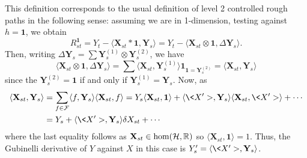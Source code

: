 \documentclass[11pt]{style/preprint}
\begin{document}
This definition corresponds to the usual definition of level 2 controlled rough paths in the following sense: 
assuming we are in 1-dimension, testing against \(h = \mathbf{1}\), we obtain
\[R^{\mathbf{1}}_{st} = Y_t - \langle \mathbf{X}_{st} * \mathbf{1}, \mathbf{Y}_s\rangle
  = Y_t - \langle \mathbf{X}_{st} \otimes \mathbf{1}, \Delta \mathbf{Y}_s\rangle.\]
Then, writing \(\Delta \mathbf{Y}_s = \sum \mathbf{Y}^{(1)}_s \otimes \mathbf{Y}^{(2)}_s\), we have 
\[\langle \mathbf{X}_{st} \otimes \mathbf{1}, \Delta \mathbf{Y}_s\rangle
  = \sum \langle \mathbf{X}_{st}, \mathbf{Y}^{(1)}_s\rangle \mathbf{1}_{\mathbf{1} = \mathbf{Y}^{(2)}_s} 
  = \langle \mathbf{X}_{st}, \mathbf{Y}_s\rangle\]
since the \(\mathbf{Y}^{(2)}_s = \mathbf{1}\) if and only if \(\mathbf{Y}^{(1)}_s = \mathbf{Y}_s\). 
Now, as 
\begin{align*}
  \langle \mathbf{X}_{st}, \mathbf{Y}_s\rangle 
  & = \sum_{f \in \CF} \langle f, \mathbf{Y}_s\rangle \langle \mathbf{X}_{st}, f\rangle
    = Y_s \langle \mathbf{X}_{st}, \mathbf{1}\rangle 
      + \langle \<X'>, \mathbf{Y}_s\rangle \langle \mathbf{X}_{st}, \<X'>\rangle + \cdots\\
  & = Y_s + \langle \<X'>, \mathbf{Y}_s\rangle \delta X_{st} + \cdots
\end{align*}
where the last equality follows as \(\mathbf{X}_{st} \in \hom({\mathcal H}, \mathbb{R})\) so 
\(\langle \mathbf{X}_{st}, \mathbf{1}\rangle = 1\). Thus, the Gubinelli derivative of \(Y\) against 
\(X\) in this case is \(Y'_s = \langle \<X'>, \mathbf{Y}_s\rangle\).
\end{document}
